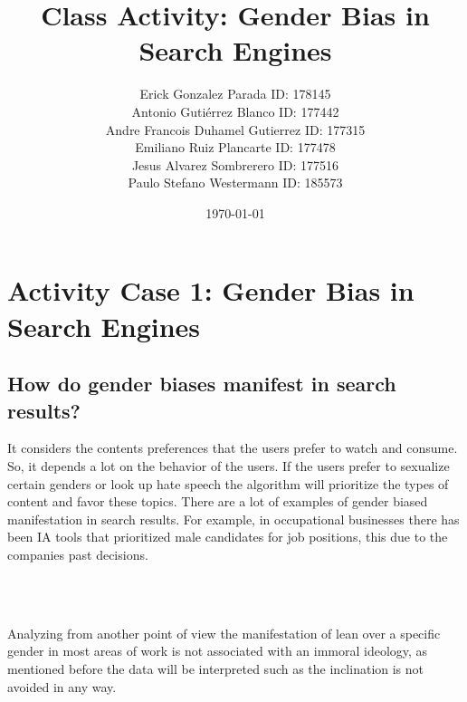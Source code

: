 \documentclass[twoside]{article}
\begin{document}

\renewcommand{\footrulewidth}{1pt}

\title{Class Activity: Gender Bias in Search Engines}
\author{Erick Gonzalez Parada ID: 178145 \\ \vspace{2mm}
Antonio Gutiérrez Blanco ID: 177442 \\ \vspace{2mm}
Andre Francois Duhamel Gutierrez ID: 177315 \\ \vspace{2mm}
Emiliano Ruiz Plancarte ID: 177478 \\ \vspace{2mm}
Jesus Alvarez Sombrerero ID: 177516 \\ \vspace{2mm}
Paulo Stefano Westermann ID: 185573 \\ \vspace{2mm}
}
\date{\today}


\maketitle

\newpage

\section*{Activity Case 1: Gender Bias in Search Engines}

\subsection*{How do gender biases manifest in search results?}
\begin{justifying}
It considers the contents preferences that the users prefer to watch and consume. So, it depends a lot on the behavior of the users. If the users prefer to sexualize certain genders or look up hate speech the algorithm will prioritize the types of content and favor these topics. There are a lot of examples of gender biased manifestation in search results. For example, in occupational businesses there has been IA tools that prioritized male candidates for job positions, this due to the companies past decisions.
\end{justifying}
\\
\\
\begin{justifying}
Analyzing from another point of view the manifestation of lean over a specific gender in most areas of work is not associated with an immoral ideology, as mentioned before the data will be interpreted such as the inclination is not avoided in any way.
\end{justifying}
\end{document}
